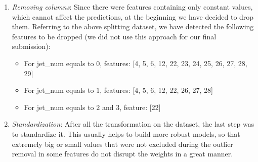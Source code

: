 \documentclass[10pt,conference,compsocconf]{IEEEtran}
\begin{document}
\begin{enumerate}
    \item \textit{Removing columns}: Since there were features containing only constant values, which cannot affect the predictions, at the beginning we have decided to drop them. 
    Referring to the above splitting dataset, we have detected the following features to be dropped (we did not use this approach for our final submission):
        \begin{itemize}
        \item For jet\_num equals to $0$, features: [4, 5, 6, 12, 22, 23, 24, 25, 26, 27, 28, 29]
        \item For jet\_num equals to $1$, features: [4, 5, 6, 12, 22, 26, 27, 28]
        \item For jet\_num equals to $2$ and $3$, feature: [22]
    \end{itemize}
    \item \textit{Standardization}: After all the transformation on the dataset, the last step was to standardize it. This usually helps to build more robust models, so that extremely big or small values that were not excluded during the outlier removal in some features do not disrupt the weights in a great manner.
\end{enumerate}
\end{document}
